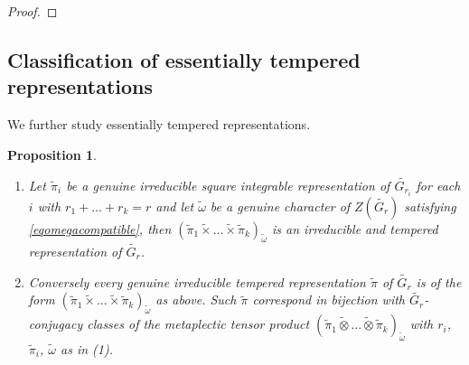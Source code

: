 \documentclass{amsart}
\numberwithin{equation}{section}
\newtheorem{proposition}[theorem]{\bf{Proposition}}
\newcommand{\wt}[1]{\widetilde{#1}}
\begin{document}
\begin{proof}
	\end{proof}
	
	\subsection{Classification of essentially tempered representations}
	
	We further study essentially tempered representations.
	
	\begin{proposition}\label{proptempclasify}
		
		\begin{enumerate}
			\item	Let $\wt{\pi}_{i}$ be a genuine irreducible square integrable representation of $\wt{G_{r_{i}}}$ for each $i$ with $r_{1}+\dots+r_{k}=r$ and let $\wt{\omega}$ be a genuine character of $Z(\wt{G_{r}})$ satisfying \eqref{eqomegacompatible}, then $(\wt{\pi}_{1}\wt{\times}\dots\wt{\times}\wt{\pi}_{k})_{\wt{\omega}}$ is an irreducible and tempered representation of $\wt{G_{r}}$.
			
			\item Conversely every genuine irreducible tempered representation $\wt{\pi}$ of $\wt{G_{r}}$ is of the form $(\wt{\pi}_{1}\wt{\times}\dots\wt{\times}\wt{\pi}_{k})_{\wt{\omega}}$ as above. Such $\wt{\pi}$ correspond in bijection with $\wt{G_{r}}$-conjugacy classes of the metaplectic tensor product $(\wt{\pi}_{1}\wt{\otimes}\dots\wt{\otimes}\wt{\pi}_{k})_{\wt{\omega}}$ with $r_{i}$, $\wt{\pi}_{i}$, $\wt{\omega}$ as in (1).
			
			
		\end{enumerate}	
		
		
	\end{proposition}
	
\end{document}
